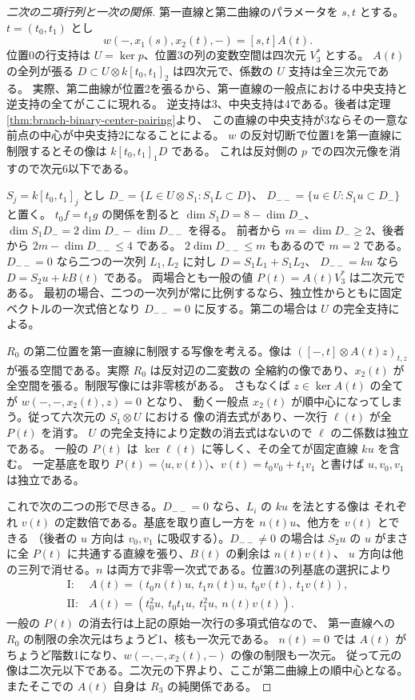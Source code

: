 \begin{proof}[二次の二項行列と一次の関係]
第一直線と第二曲線のパラメータを $s,t$ とする。$t=(t_0,t_1)$ とし
\[
              w(-,x_1(s),x_2(t),-)=[s,t]A(t).
\]
位置0の行支持は $U=\ker p$、位置3の列の変数空間は四次元 $V_3^*$ とする。
$A(t)$ の全列が張る $D\subset U\otimes k[t_0,t_1]_2$ は四次元で、係数の $U$ 支持は全三次元である。
実際、第二曲線が位置2を張るから、第一直線の一般点における中央支持と逆支持の全てがここに現れる。
逆支持は3、中央支持は4である。後者は定理\ref{thm:branch-binary-center-pairing}より、
この直線の中央支持が3ならその一意な前点の中心が中央支持2になることによる。
$w$ の反対切断で位置1を第一直線に制限するとその像は $k[t_0,t_1]_1D$ である。
これは反対側の $p$ での四次元像を消すので次元6以下である。

$S_j=k[t_0,t_1]_j$ とし $D_-=\{L\in U\otimes S_1:S_1L\subset D\}$、
$D_{--}=\{u\in U:S_1u\subset D_-\}$ と置く。
$t_0 f=t_1 g$ の関係を割ると $\dim S_1D=8-\dim D_-$、
$\dim S_1D_-=2\dim D_- -\dim D_{--}$ を得る。
前者から $m=\dim D_-\ge2$、後者から $2m-\dim D_{--}\le4$ である。
$2\dim D_{--}\le m$ もあるので $m=2$ である。
$D_{--}=0$ なら二つの一次列 $L_1,L_2$ に対し $D=S_1L_1+S_1L_2$、
$D_{--}=ku$ なら $D=S_2 u+kB(t)$ である。
両場合とも一般の値 $P(t)=A(t)V_3^*$ は二次元である。
最初の場合、二つの一次列が常に比例するなら、独立性からともに固定ベクトルの一次式倍となり
$D_{--}=0$ に反する。第二の場合は $U$ の完全支持による。

$R_0$ の第二位置を第一直線に制限する写像を考える。像は
$([-,t]\otimes A(t)z)_{t,z}$ が張る空間である。実際 $R_0$ は反対辺の二変数の
全縮約の像であり、$x_2(t)$ が全空間を張る。制限写像には非零核がある。
さもなくば $z\in\ker A(t)$ の全てが $w(-,-,x_2(t),z)=0$ となり、
動く一般点 $x_2(t)$ が順中心になってしまう。従って六次元の $S_1\otimes U$ における
像の消去式があり、一次行 $\ell(t)$ が全 $P(t)$ を消す。
$U$ の完全支持により定数の消去式はないので $\ell$ の二係数は独立である。
一般の $P(t)$ は $\ker\ell(t)$ に等しく、その全てが固定直線 $ku$ を含む。
一定基底を取り $P(t)=\langle u,v(t)\rangle$、$v(t)=t_0 v_0+t_1 v_1$ と書けば
$u,v_0,v_1$ は独立である。

これで次の二つの形で尽きる。$D_{--}=0$ なら、$L_i$ の $ku$ を法とする像は
それぞれ $v(t)$ の定数倍である。基底を取り直し一方を $n(t)u$、他方を $v(t)$ とできる
（後者の $u$ 方向は $v_0,v_1$ に吸収する）。$D_{--}\ne0$ の場合は $S_2u$ の
$u$ がまさに全 $P(t)$ に共通する直線を張り、$B(t)$ の剰余は $n(t)v(t)$、
$u$ 方向は他の三列で消せる。$n$ は両方で非零一次式である。位置3の列基底の選択により
\[
 \begin{array}{ll}
 \mathrm{I}: & A(t)=(t_0 n(t)u,\ t_1 n(t)u,\ t_0 v(t),\ t_1 v(t)),\\
 \mathrm{II}:& A(t)=(t_0^2 u,\ t_0t_1 u,\ t_1^2u,\ n(t)v(t)).
 \end{array}
\]
一般の $P(t)$ の消去行は上記の原始一次行の多項式倍なので、
第一直線への $R_0$ の制限の余次元はちょうど1、核も一次元である。
$n(t)=0$ では $A(t)$ がちょうど階数1になり、$w(-,-,x_2(t),-)$ の像の制限も一次元。
従って元の像は二次元以下である。二次元の下界より、ここが第二曲線上の順中心となる。
またそこでの $A(t)$ 自身は $R_3$ の純関係である。
\end{proof}
